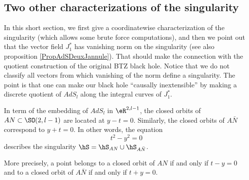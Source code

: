 \subsection{Two other characterizations of the singularity}		\label{SubSecTwoCharSing}
 
In this short section, we first give a coordinatewise characterization of the singularity (which allows some brute force computations), and then we point out that the vector field $J_1^*$ has vanishing norm on the singularity (see also proposition \ref{PropAdSDeuxJannule}). That should make the connection with the quotient construction of the original BTZ black hole.  Notice that we do not classify all vectors from which vanishing of the norm define a singularity. The point is that one can make our black hole ``causally inextensible'' by making a discrete quotient of $AdS_l$ along the integral curves of $J^*_1$.

\begin{proposition}		\label{Proptcarrycarr}
In term of the embedding of $AdS_l$ in $\eR^{2,l-1}$, the closed orbits of $AN \subset \SO(2,l-1)$ are located at $y-t = 0$.  Similarly, the closed orbits of $A \bar{N}$ correspond to $y+t=0$. In other words, the equation
\begin{equation} \label{tcarrycarr}
t^2-y^2=0
 \end{equation}
describes the singularity $\hS=\hS_{AN}\cup\hS_{A\bar{N}}$.

More precisely, a point belongs to a closed orbit of $AN$ if and only if $t-y=0$ and to a closed orbit of $A\bar N$ if and only if $t+y=0$.
\end{proposition}

